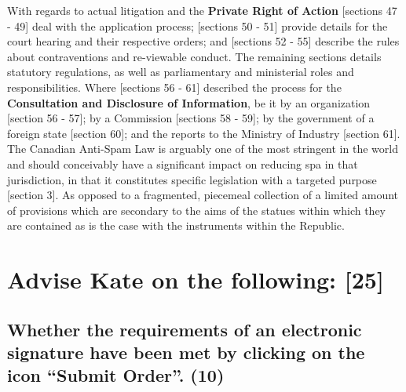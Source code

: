 \documentclass[11pt]{article}
\begin{document}
With regards to actual litigation and the \textbf{Private Right of Action} [sections
47 - 49]\cite{ca10_anti_spam_act} deal with the application process; [sections
50 - 51]\cite{ca10_anti_spam_act} provide details for the court hearing and their
respective orders; and [sections 52 - 55]\cite{ca10_anti_spam_act} describe the
rules about contraventions and re-viewable conduct. The remaining sections
details statutory regulations, as well as parliamentary and ministerial roles
and responsibilities. Where [sections 56 - 61]\cite{ca10_anti_spam_act} described
the process for the \textbf{Consultation and Disclosure of Information}, be it by an
organization [section 56 - 57]\cite{ca10_anti_spam_act}; by a Commission [sections
58 - 59]\cite{ca10_anti_spam_act}; by the government of a foreign state [section
60]\cite{ca10_anti_spam_act}; and the reports to the Ministry of Industry [section
61]\cite{ca10_anti_spam_act}.\\

The Canadian Anti-Spam Law \cite{ca10_anti_spam_act} is arguably one of the most
stringent in the world and should conceivably have a significant impact on
reducing spa in that jurisdiction, in that it constitutes specific legislation
with a targeted purpose [section 3]\cite{ca10_anti_spam_act}. As opposed to a
fragmented, piecemeal collection of a limited amount of provisions
\cite{hermann14_direct_marketing_vs_spam,tladi08_reg_unsol_comm} which are
secondary to the aims of the statues within which they are contained
\cite{rsa02_elect_comm_trans_act,rsa12_elect_comm_trans_amend_bill,rsa08_cpa,rsa13_popi}
as is the case with the instruments within the Republic.

\section{Advise Kate on the following: [25]}
\label{sec:orge67e3a0}

\subsection{Whether the requirements of an electronic signature have been met by clicking on the icon ``Submit Order''. (10)}
\label{sec:orgc5bf908}
\end{document}
